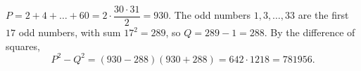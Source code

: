 $P=2+4+\dots+60=2\cdot\dfrac{30\cdot31}{2}=930$. The odd numbers $1,3,\dots,33$ are the first $17$ odd numbers, with sum $17^2=289$, so $Q=289-1=288$. By the difference of squares,
\[
P^2-Q^2=(930-288)(930+288)=642\cdot1218=\boxed{781956}.
\]
